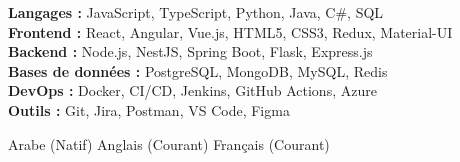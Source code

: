 \documentclass[11pt,a4paper]{article}
\begin{document}
{\small
\textbf{Langages :} JavaScript, TypeScript, Python, Java, C\#, SQL\\[1.5pt]
\textbf{Frontend :} React, Angular, Vue.js, HTML5, CSS3, Redux, Material-UI\\[1.5pt]
\textbf{Backend :} Node.js, NestJS, Spring Boot, Flask, Express.js\\[1.5pt]
\textbf{Bases de données :} PostgreSQL, MongoDB, MySQL, Redis\\[1.5pt]
\textbf{DevOps :} Docker, CI/CD, Jenkins, GitHub Actions, Azure\\[1.5pt]
\textbf{Outils :} Git, Jira, Postman, VS Code, Figma
}

Arabe (Natif) \textbar{} Anglais (Courant) \textbar{} Français (Courant)

\end{document}

